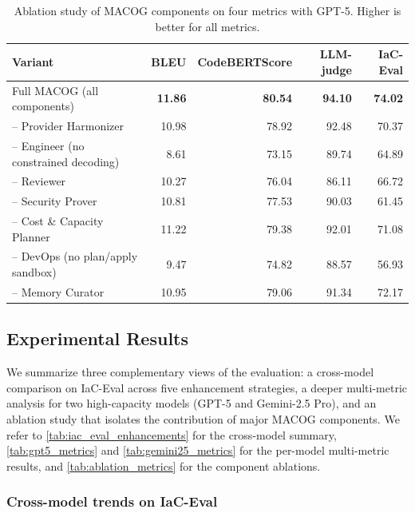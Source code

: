 \documentclass[manuscript,screen,nonacm]{acmart}
\begin{document}
\begin{table}[t]
\centering
\caption{Ablation study of MACOG components on four metrics with GPT-5. Higher is better for all metrics.}
\label{tab:ablation_metrics}
\small
\setlength{\tabcolsep}{6pt}
\begin{tabular}{@{}lrrrr@{}}
\toprule
\textbf{Variant} & \textbf{BLEU} & \textbf{CodeBERTScore} & \textbf{LLM-judge} & \textbf{IaC-Eval} \\
\midrule
Full MACOG (all components)           & \textbf{11.86} & \textbf{80.54} & \textbf{94.10} & \textbf{74.02} \\
\addlinespace[2pt]
-- Provider Harmonizer                & 10.98 & 78.92 & 92.48 & 70.37 \\
-- Engineer (no constrained decoding) &  8.61 & 73.15 & 89.74 & 64.89 \\
-- Reviewer                           & 10.27 & 76.04 & 86.11 & 66.72 \\
-- Security Prover                    & 10.81 & 77.53 & 90.03 & 61.45 \\
-- Cost \& Capacity Planner           & 11.22 & 79.38 & 92.01 & 71.08 \\
-- DevOps (no plan/apply sandbox)     &  9.47 & 74.82 & 88.57 & 56.93 \\
-- Memory Curator                     & 10.95 & 79.06 & 91.34 & 72.17 \\
\bottomrule
\end{tabular}
\end{table}


\subsection{Experimental Results}
\label{sec:exp-results}

We summarize three complementary views of the evaluation: a cross-model comparison on IaC-Eval \cite{kon2024iac} across five enhancement strategies, a deeper multi-metric analysis for two high-capacity models (GPT-5 and Gemini-2.5 Pro), and an ablation study that isolates the contribution of major MACOG components. We refer to \autoref{tab:iac_eval_enhancements} for the cross-model summary, \autoref{tab:gpt5_metrics} and \autoref{tab:gemini25_metrics} for the per-model multi-metric results, and \autoref{tab:ablation_metrics} for the component ablations.

\subsubsection{Cross-model trends on IaC-Eval}
\end{document}
